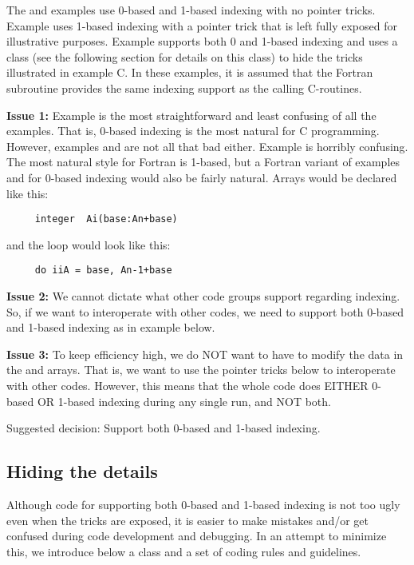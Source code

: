 The  and  examples use 0-based and 1-based indexing
with no pointer tricks.  Example  uses 1-based indexing with a
pointer trick that is left fully exposed for illustrative purposes.
Example  supports both 0 and 1-based indexing and uses a
 class (see the following section for details on
this class) to hide the tricks illustrated in example C.  In these
examples, it is assumed that the Fortran subroutine provides the same
indexing support as the calling C-routines.

{\bf Issue 1:} Example  is the most straightforward and least
confusing of all the examples.  That is, 0-based indexing is the most
natural for C programming.  However, examples  and 
are not all that bad either.  Example  is horribly confusing.
The most natural style for Fortran is 1-based, but a Fortran variant
of examples  and  for 0-based indexing would also be
fairly natural.  Arrays would be declared like this:
\begin{verbatim}
     integer  Ai(base:An+base)
\end{verbatim}
and the  loop would look like this:
\begin{verbatim}
     do iiA = base, An-1+base
\end{verbatim}

{\bf Issue 2:} We cannot dictate what other code groups support regarding
indexing.  So, if we want to interoperate with other codes, we need to
support both 0-based and 1-based indexing as in example  below.

{\bf Issue 3:} To keep efficiency high, we do NOT want to have to modify the
data in the  and  arrays.  That is, we want to use the
pointer tricks below to interoperate with other codes.  However, this
means that the whole code does EITHER 0-based OR 1-based indexing
during any single run, and NOT both.

Suggested decision: Support both 0-based and 1-based indexing.

\subsection{Hiding the details}
\label{Hiding the details}

Although code for supporting both 0-based and 1-based indexing is not
too ugly even when the tricks are exposed, it is easier to make
mistakes and/or get confused during code development and debugging.
In an attempt to minimize this, we introduce below a
 class and a set of coding rules and guidelines.

